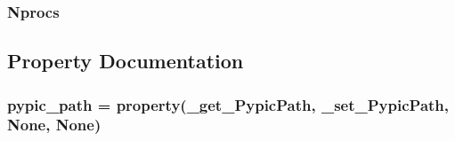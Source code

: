 \subsubsection[{Nprocs}]{\setlength{\rightskip}{0pt plus 5cm}Nprocs}\label{classpyneb_1_1utils_1_1_config_1_1___config_ade05ba3ca67358e003a5068f5c8d0943}


\subsection{Property Documentation}
\hypertarget{classpyneb_1_1utils_1_1_config_1_1___config_a2cb68c3749e1d6a9c68b83594bfb2973}{}
\subsubsection[{pypic\+\_\+path}]{\setlength{\rightskip}{0pt plus 5cm}pypic\+\_\+path = property(\+\_\+get\+\_\+\+Pypic\+Path, \+\_\+set\+\_\+\+Pypic\+Path, None, None)\hspace{0.3cm}{\ttfamily [static]}}\label{classpyneb_1_1utils_1_1_config_1_1___config_a2cb68c3749e1d6a9c68b83594bfb2973}
